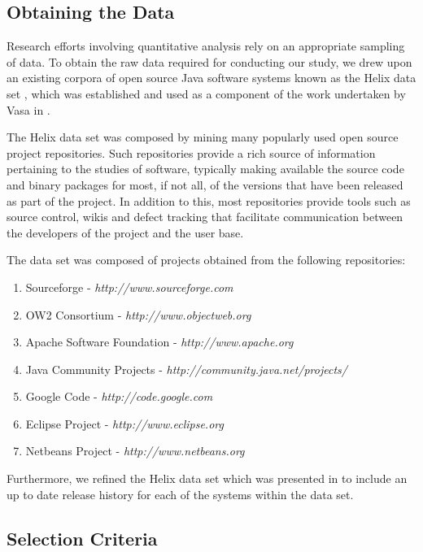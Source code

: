 
\subsection{Obtaining the Data} %
\label{sub:obtaining_the_data}

Research efforts involving quantitative analysis rely on an appropriate sampling of data. To obtain the raw data required for conducting our study, we drew upon an existing corpora of open source Java software systems known as the Helix data set \cite{Helix10a}, which was established and used as a component of the work undertaken by Vasa in \cite{Vasa10a}.

The Helix data set was composed by mining many popularly used open source project repositories. Such repositories provide a rich source of information pertaining to the studies of software, typically making available the source code and binary packages for most, if not all, of the versions that have been released as part of the project. In addition to this, most repositories provide tools such as source control, wikis and defect tracking that facilitate communication between the developers of the project and the user base.

\bigskip
The data set was composed of projects obtained from the following repositories:
\begin{enumerate}
	\item Sourceforge - {\em http://www.sourceforge.com}
	\item OW2 Consortium - {\em http://www.objectweb.org}
	\item Apache Software Foundation - {\em http://www.apache.org}
	\item Java Community Projects - {\em http://community.java.net/projects/}
	\item Google Code - {\em http://code.google.com}
	\item Eclipse Project - {\em http://www.eclipse.org}
	\item Netbeans Project - {\em http://www.netbeans.org}
\end{enumerate}

Furthermore, we refined the Helix data set which was presented in \cite{Vasa10a} to include an up to date release history for each of the systems within the data set.


\subsection{Selection Criteria} %
\label{sub:selection_criteria}

